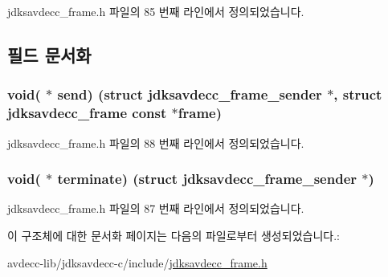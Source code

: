 jdksavdecc\+\_\+frame.\+h 파일의 85 번째 라인에서 정의되었습니다.



\subsection{필드 문서화}
\subsubsection[{\texorpdfstring{send}{send}}]{\setlength{\rightskip}{0pt plus 5cm}void( $\ast$ send) (struct {\bf jdksavdecc\+\_\+frame\+\_\+sender} $\ast$, struct {\bf jdksavdecc\+\_\+frame} const $\ast${\bf frame})}\hypertarget{structjdksavdecc__frame__sender_aaba8425858e063d1c81af62be9044449}{}\label{structjdksavdecc__frame__sender_aaba8425858e063d1c81af62be9044449}


jdksavdecc\+\_\+frame.\+h 파일의 88 번째 라인에서 정의되었습니다.

\subsubsection[{\texorpdfstring{terminate}{terminate}}]{\setlength{\rightskip}{0pt plus 5cm}void( $\ast$ terminate) (struct {\bf jdksavdecc\+\_\+frame\+\_\+sender} $\ast$)}\hypertarget{structjdksavdecc__frame__sender_ae0dab1fa8921638cb5f3f79898a6ad30}{}\label{structjdksavdecc__frame__sender_ae0dab1fa8921638cb5f3f79898a6ad30}


jdksavdecc\+\_\+frame.\+h 파일의 87 번째 라인에서 정의되었습니다.



이 구조체에 대한 문서화 페이지는 다음의 파일로부터 생성되었습니다.\+:\begin{DoxyCompactItemize}
\item 
avdecc-\/lib/jdksavdecc-\/c/include/\hyperlink{jdksavdecc__frame_8h}{jdksavdecc\+\_\+frame.\+h}\end{DoxyCompactItemize}
